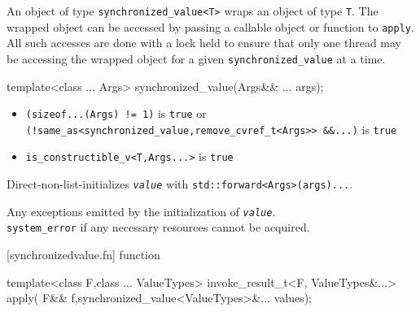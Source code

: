 \pnum   
An object of type \texttt{synchronized\_value\textless{}T\textgreater{}}
wraps an object of type \texttt{T}. The wrapped object can be accessed
by passing a callable object or function to \texttt{apply}. All such
accesses are done with a lock held to ensure that only one thread may be
accessing the wrapped object for a given \texttt{synchronized\_value} at
a time.

\begin{itemdecl}

template<class ... Args>
synchronized_value(Args&& ... args);
\end{itemdecl}



\begin{itemdescr}
\pnum
\constraints
\begin{itemize}
\item 
  \texttt{(sizeof...(Args)\ !=\ 1)} is \texttt{true} or
  \texttt{(!same\_as\textless{}synchronized\_value,remove\_cvref\_t\textless{}Args\textgreater{}\textgreater{}\ \&\&...)}
  is \texttt{true}
\item
  \texttt{is\_constructible\_v\textless{}T,Args...\textgreater{}} is
  \texttt{true}
\end{itemize}
\pnum
\effects
Direct-non-list-initializes \emph{\texttt{value}} with
\texttt{std::forward\textless{}Args\textgreater{}(args)...}.

\pnum
\throws
Any exceptions emitted by the initialization of \emph{\texttt{value}}.\\
\texttt{system\_error} if any necessary resources cannot be acquired.
\end{itemdescr}


[synchronizedvalue.fn]{ function }

\begin{itemdecl}
    template<class F,class ... ValueTypes>
    invoke_result_t<F, ValueTypes&...> apply(
        F&& f,synchronized_value<ValueTypes>&... values);
\end{itemdecl}

